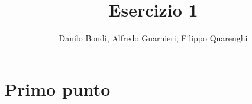 \documentclass[10pt, titlepage]{article}
\title{\textbf{Esercizio 1}}
\author{Danilo Bondì, Alfredo Guarnieri, Filippo Quarenghi}
\date{}
\begin{document}

%

\section*{Primo punto}


\end{document}
